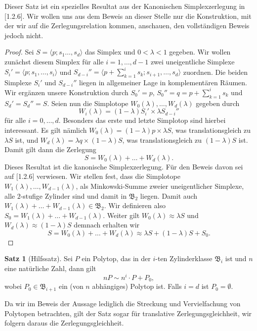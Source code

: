 \documentclass[11pt,titlepage]{article}
\theoremstyle{definition}
\newtheorem{theorem}{Satz}[section]
\theoremstyle{remark}
\begin{document}
	Dieser Satz ist ein spezielles Resultat aus der Kanonischen Simplexzerlegung 
	in \cite{Hadwiger}[1.2.6]. Wir wollen uns aus dem Beweis an dieser 
	Stelle nur die Konstruktion, mit 
	der wir auf die Zerlegungsrelation kommen, anschauen, den vollständigen 
	Beweis jedoch nicht.
	
	\begin{proof}
		Sei $S=\langle p;s_1\ldots,s_d\rangle$ das Simplex und 
		$0<\lambda<1$ gegeben. Wir wollen 
		zunächst diesem Simplex für alle $i=1,\ldots,d-1$ zwei 
		uneigentliche Simplexe $S_i'=\langle p;s_1,\ldots,s_i\rangle$ und 
		$S_{d-i}''=\langle p+\sum_{k=1}^i s_k ;s_{i+1},\ldots,s_d\rangle$ 
		zuordnen. Die beiden Simplexe $S_i'$ und $S_{d-i}''$ liegen 
		in allgemeiner Lage in komplementären Räumen. Wir ergänzen 
		unsere Konstruktion durch $S_0'=p$, $S_0''=q=p+\sum_{k=1}^i s_k$ und 
		$S_d'=S_d''=S$. Seien nun die Simplotope 
		$W_0(\lambda),\ldots,W_d(\lambda)$ gegeben durch
		\[W_i(\lambda)=(1-\lambda)S_i' \times \lambda S_{d-i}''\]
		für alle $i=0,\ldots,d$. Besonders das erste und letzte Simplotop 
		sind hierbei interessant. Es gilt nämlich 
		$W_0(\lambda)=(1-\lambda)p\times \lambda S$, was translationsgleich 
		zu $\lambda S$ ist, und $W_d(\lambda)=\lambda q\times (1-\lambda) S$, 
		was translationsgleich zu $(1-\lambda)S$ ist. Damit gilt dann 
		die Zerlegung
		\[S=W_0(\lambda)+\ldots+W_d(\lambda).\]
		Dieses Resultat ist die kanonische Simplexzerlegung. Für den Beweis 
		davon sei auf \cite{Hadwiger}[1.2.6] verwiesen. 
		Wir stellen fest, dass die Simplotope $W_1(\lambda),\ldots,W_{d-1}(\lambda)$, als 
		Minkowski-Summe zweier uneigentlicher Simplexe, alle $2$-stufige Zylinder 
		sind und damit in $\mathfrak{B}_2$ liegen. Damit auch 
		$W_1(\lambda)+\ldots+W_{d-1}(\lambda)\in\mathfrak{B}_2$. Wir 
		definieren also $S_0=W_1(\lambda)+\ldots+W_{d-1}(\lambda)$. 
		Weiter gilt $W_0(\lambda)\approx \lambda S$ und 
		$W_d(\lambda)\approx (1-\lambda)S$ demnach erhalten wir
		\[S=W_0(\lambda)+\ldots+W_d(\lambda)\approx \lambda S+(1-\lambda)S+S_0.\]
	\end{proof}
	
	\begin{theorem}[Hilfssatz]\label{thm:hilfssatz}
		Sei $P$ ein Polytop, das in der $i$-ten Zylinderklasse $\mathfrak{B}_i$ ist 
		und $n$ eine natürliche Zahl, dann gilt
		\[nP\sim n^i\cdot P+P_0,\]
		wobei $P_0\in\mathfrak{B}_{i+1}$ ein (von $n$ abhängiges) Polytop ist. 
		Falls $i=d$ ist $P_0=\emptyset$.
	\end{theorem}
	
	Da wir im Beweis der Aussage lediglich die Streckung und Vervielfachung 
	von Polytopen betrachten, gilt der Satz sogar für translative Zerlegungsgleichheit, 
	wir folgern daraus die Zerlegungsgleichheit.
	
\end{document}
